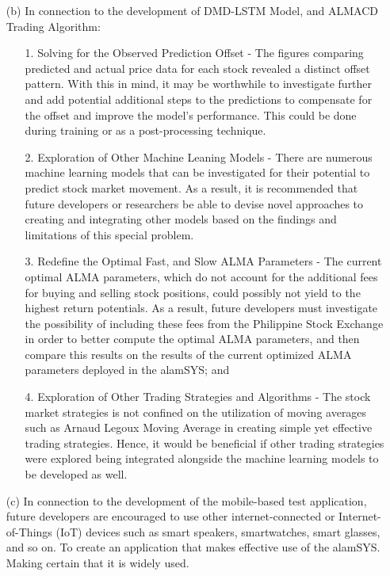 \begin{itemize}
    \item[(b)] In connection to the development of DMD-LSTM Model, and ALMACD Trading Algorithm:
        \begin{itemize}
            \item[1.] Solving for the Observed Prediction Offset - 
            The figures comparing predicted and actual price data for each stock 
            revealed a distinct offset pattern. With this in mind, it may be 
            worthwhile to investigate further and add potential additional steps 
            to the predictions to compensate for the offset and improve the model's 
            performance. This could be done during training or as a post-processing 
            technique.
            \item[2.] Exploration of Other Machine Leaning Models - 
            There are numerous machine learning models that can be investigated for 
            their potential to predict stock market movement. As a result, it is 
            recommended that future developers or researchers be able to devise novel 
            approaches to creating and integrating other models based on the findings 
            and limitations of this special problem.
            \item[3.] Redefine the Optimal Fast, and Slow ALMA Parameters - 
            The current optimal ALMA parameters, which do not account for the 
            additional fees for buying and selling stock positions, could possibly 
            not yield to the highest return potentials. As a result, future developers 
            must investigate the possibility of including these fees from the 
            Philippine Stock Exchange in order to better compute the optimal 
            ALMA parameters, and then compare this results on the results of the
            current optimized ALMA parameters deployed in the alamSYS; and
            \item[4.] Exploration of Other Trading Strategies and Algorithms - 
            The stock market strategies is not confined on the utilization of moving 
            averages such as Arnaud Legoux Moving Average in creating simple yet 
            effective trading strategies. Hence, it would be beneficial if other trading 
            strategies were explored being integrated alongside the machine learning 
            models to be developed as well.
        \end{itemize}

    \item[(c)] In connection to the development of the mobile-based test application, 
    future developers are encouraged to use other internet-connected or 
    Internet-of-Things (IoT) devices such as smart speakers, smartwatches, 
    smart glasses, and so on. To create an application that makes effective 
    use of the alamSYS. Making certain that it is widely used.
\end{itemize}